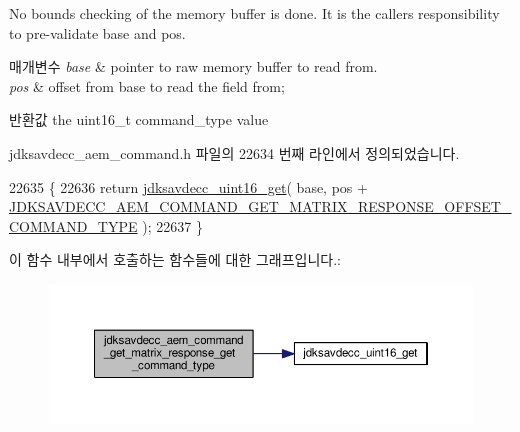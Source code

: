 No bounds checking of the memory buffer is done. It is the caller\textquotesingle{}s responsibility to pre-\/validate base and pos.


\begin{DoxyParams}{매개변수}
{\em base} & pointer to raw memory buffer to read from. \\
\hline
{\em pos} & offset from base to read the field from; \\
\hline
\end{DoxyParams}
\begin{DoxyReturn}{반환값}
the uint16\+\_\+t command\+\_\+type value 
\end{DoxyReturn}


jdksavdecc\+\_\+aem\+\_\+command.\+h 파일의 22634 번째 라인에서 정의되었습니다.


\begin{DoxyCode}
22635 \{
22636     \textcolor{keywordflow}{return} \hyperlink{group__endian_ga3fbbbc20be954aa61e039872965b0dc9}{jdksavdecc\_uint16\_get}( base, pos + 
      \hyperlink{group__command__get__matrix__response_ga5799af15dc753ef971de43ce77445795}{JDKSAVDECC\_AEM\_COMMAND\_GET\_MATRIX\_RESPONSE\_OFFSET\_COMMAND\_TYPE}
       );
22637 \}
\end{DoxyCode}


이 함수 내부에서 호출하는 함수들에 대한 그래프입니다.\+:
\nopagebreak
\begin{figure}[H]
\begin{center}
\leavevmode
\includegraphics[width=350pt]{group__command__get__matrix__response_gad5214f8f0eb608a58db65cace21f5257_cgraph}
\end{center}
\end{figure}


